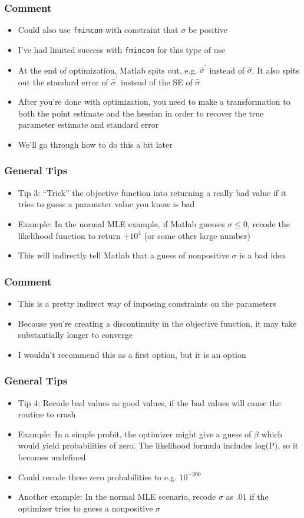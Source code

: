 \documentclass[english,xcolor=dvipsnames]{beamer}
\newcommand{\bi}{\begin{itemize}}
\newcommand{\ei}{\end{itemize}}
\begin{document}
\begin{frame}
\frametitle{Comment}
      \bi 
      \item Could also use \texttt{fmincon} with constraint that $\sigma$ be positive
      \item I've had limited success with \texttt{fmincon} for this type of use
      \item At the end of optimization, Matlab spits out, e.g. $\hat{\sigma}^{\prime} $ instead of $\hat{\sigma}$. It also spits out the standard error of $\hat{\sigma}^{\prime} $ instead of the SE of $\hat{\sigma}$
      \item After you're done with optimization, you need to make a transformation to both the point estimate and the hessian in order to recover the true parameter estimate and standard error
      \item We'll go through how to do this a bit later
      \ei
\end{frame}

\begin{frame}
\frametitle{General Tips}

   \bi 
   \item Tip 3: ``Trick'' the objective function into returning a really bad value if it tries to guess a parameter value you know is bad
      \item Example: In the normal MLE example, if Matlab guesses $\sigma \leq 0$, recode the likelihood function to return $+10^4$ (or some other large number)
      \item This will indirectly tell Matlab that a guess of nonpositive $\sigma$ is a bad idea
   \ei
\end{frame}

\begin{frame}
\frametitle{Comment}

      \bi 
      \item This is a pretty indirect way of imposing constraints on the parameters
      \item Because you're creating a discontinuity in the objective function, it may take substantially longer to converge
      \item I wouldn't recommend this as a first option, but it is an option
   \ei
\end{frame}

\begin{frame}
\frametitle{General Tips}

   \bi 
   \item Tip 4: Recode bad values as good values, if the bad values will cause the routine to crash
      \item Example: In a simple probit, the optimizer might give a guess of $\beta$ which would yield probabilities of zero. The likelihood formula includes log(P), so it becomes undefined
      \item Could recode these zero probabilities to e.g. $10^{-200}$
      \item Another example: In the normal MLE scenario, recode $\sigma$ as $.01$ if the optimizer tries to guess a nonpositive $\sigma$
   \ei
\end{frame}
\end{document}
